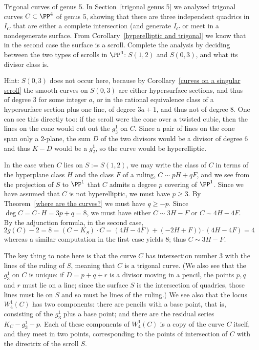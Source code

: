 \begin{exercise} Trigonal curves of genus 5.\label{trigonal genus 5} 
In Section~\ref{trigonal genus 5} we analyzed trigonal curves $C\subset \PP^4$ of genus 5, showing that
there are three independent quadrics in $I_C$ that are either a complete intersection (and generate $I_C$ or
meet in a nondegenerate surface. From Corollary~\ref{hyperelliptic and trigonal} we know that in the second case
the surface is a scroll. Complete the analysis by deciding between the two types of scrolls in $\PP^4$: $S(1,2)$ and $S(0,3)$,
and what its divisor class is.

 Hint: $S(0,3)$ does not occur here, because by Corollary~\ref{curves on a singular scroll} the smooth curves on $S(0,3)$ are either hypersurface sections, and thus of degree $3$ for
some integer $a$, or in the rational equivalence class of a hypersurface section plus one line,
of degree $3a+1$, and thus not of degree 8. One can see this directly too: if the scroll were the cone over
a twisted cubic, then the lines on the cone would cut out the $g^1_3$ on $C$. Since a pair of lines on the cone span
only a 2-plane, the sum $D$ of the two divisors would be a divisor of degree 6  and thus $K-D$ would be a $g^1_2$, 
so the curve would be hyperelliptic.

In the case when $C$ lies on $S := S(1,2)$, we may write the class of $C$ in terms of the hyperplane class $H$ and the class $F$ of a ruling, $C\sim pH+qF$, and we see from the 
projection of $S$ to $\PP^1$ that $C$ admits
a degree $p$ covering of $\PP^1$. Since we have assumed that $C$ is not hyperelliptic,
we must have $p\geq 3$. By Theorem~\ref{where are the curves?} we must have
$q\geq -p$. Since $\deg C = C\cdot H = 3p+q = 8$, we must have either 
$C\sim 3H-F$ or $C\sim 4H-4F$. By the adjunction formula, in the second case,
$$
2g(C)-2 = 8 = (C+K_S)\cdot C = (4H-4F)+(-2H+F))\cdot(4H-4F) =4
$$
whereas a similar computation in the first case yields 8; thus $C\sim 3H-F$.

The key thing to note here is that the curve $C$ has intersection number 3 with the lines of the ruling of $S$, meaning that $C$ is a trigonal curve. (We also see that the $g^1_3$ on $C$ is unique: if $D = p + q + r$ is a divisor moving in a pencil, the points $p, q$ and $r$ must lie on a line; since the surface $S$ is the intersection of quadrics, those lines must lie on $S$ and so must be  lines  of the ruling.) We see also that the locus $W^1_4(C)$ has two components: there are pencils with a base point, that is, consisting of the $g^1_3$ plus a base point; and there are the residual series $K_C - g^1_3 - p$. Each of these components of $W^1_4(C)$ is a copy of the curve $C$ itself, and they meet in two points, corresponding to the points of intersection of $C$ with the directrix of the scroll $S$.
\end{exercise}


%





